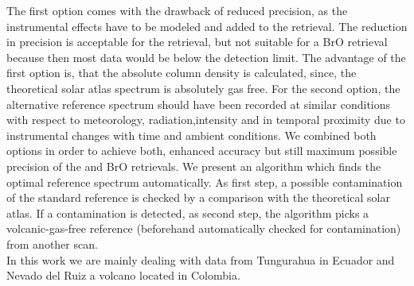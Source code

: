 The first option comes with the drawback of reduced precision, as the
instrumental effects have to be modeled and added to the retrieval. The reduction in precision is acceptable for the  retrieval, but not suitable for a BrO retrieval because then most data would be below the detection limit. The advantage of the first option is, that the absolute column density is calculated, since, the theoretical solar atlas spectrum is absolutely gas free. For the second option, the alternative reference spectrum should
have been recorded at similar conditions with respect to meteorology,
radiation,intensity and in temporal proximity due to instrumental changes
with time and ambient conditions. We combined both options in order to
achieve both, enhanced accuracy but still maximum possible precision of
the  and BrO retrievals. We present an algorithm which finds the
optimal reference spectrum automatically. As first step, a possible 
contamination of the standard reference is checked by a comparison with
the theoretical solar atlas. If a contamination is detected, as second step,
the algorithm picks a volcanic-gas-free reference (beforehand
automatically checked for contamination) from another scan.\\
%
\newline
%
In this work we are mainly dealing with data from Tungurahua in Ecuador and Nevado del Ruiz a volcano located in Colombia.